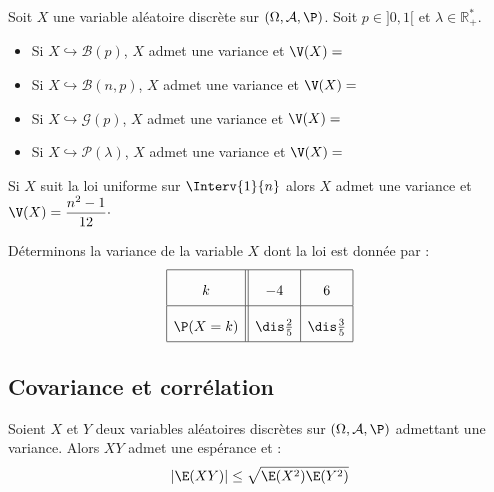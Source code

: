 \documentclass[a4paper,10pt]{report}
\begin{document}
\begin{thm}
Soit $X$ une variable aléatoire discrète sur $(\Omega, \mathcal{A}, \P)$. Soit $p \in ]0,1[$ et $\lambda \in \mathbb{R}_+^{*}$.

\begin{itemize}
\item Si $X \hookrightarrow \mathcal{B}(p)$, $X$ admet une variance et $\V(X)=$
\item Si $X \hookrightarrow \mathcal{B}(n,p)$, $X$ admet une variance et $\V(X)=$
\item Si $X \hookrightarrow \mathcal{G}(p)$, $X$ admet une variance et $\V(X)= $
\item Si $X \hookrightarrow \mathcal{P}(\lambda)$, $X$ admet une variance et $\V(X)= $
\end{itemize}
\end{thm}

\begin{preuve}

\vspace{15cm}
\end{preuve}

\begin{rem} Si $X$ suit la loi uniforme sur $\Interv{1}{n}$ alors $X$ admet une variance et $\V(X) = \dfrac{n^2-1}{12} \cdot$
\end{rem} 

\begin{ex} Déterminons la variance de la variable $X$ dont la loi est donnée par :
$$\renewcommand{\arraystretch}{2.1}\begin{array}{|c||c|c|}
\hline
k & -4 & 6\\
\hline
\P(X=k) & \dis\frac 2 5 & \dis \frac 3 5\\
\hline
\end{array}$$

\vspace{4cm}
\end{ex}

\subsection{Covariance et corrélation}

\begin{prop}
Soient $X$ et $Y$ deux variables aléatoires discrètes sur $(\Omega, \mathcal{A}, \P)$ admettant une variance. Alors $XY$ admet une espérance et :
$$ \vert \E(XY) \vert \leq \sqrt{\E(X^2)\E(Y^2)}$$
\end{prop}
\end{document}
